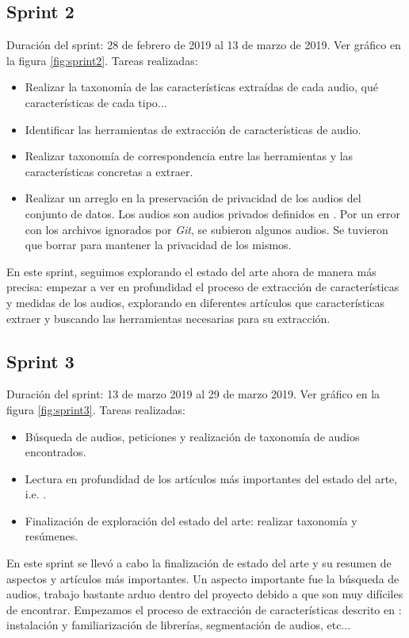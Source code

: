 \subsection{Sprint 2}
Duración del sprint: 28 de febrero de 2019 al 13 de marzo de 2019. Ver gráfico  en la figura \ref{fig:sprint2}.
Tareas realizadas:
\begin{itemize}
\item Realizar la taxonomía de las características extraídas de cada audio, qué características de cada tipo...
\item Identificar las herramientas de extracción de características de audio.
\item Realizar taxonomía de correspondencia entre las herramientas y las características concretas a extraer.
\item Realizar un arreglo en la preservación de privacidad de los audios del conjunto de datos. Los audios son audios privados definidos en \cite{OrzCorpus}. Por un error con los archivos ignorados por \textit{Git}, se subieron algunos audios. Se tuvieron que borrar para mantener la privacidad de los mismos.
\end{itemize}
En este sprint, seguimos explorando el estado del arte ahora de manera más precisa: empezar a ver en profundidad el proceso de extracción de características y medidas de los audios, explorando en diferentes artículos que características extraer y buscando las herramientas necesarias para su extracción.

\subsection{Sprint 3}
Duración del sprint: 13 de marzo 2019 al 29 de marzo 2019. Ver gráfico  en la figura \ref{fig:sprint3}.
Tareas realizadas:
\begin{itemize}
\item Búsqueda de audios, peticiones y realización de taxonomía de audios encontrados.
\item Lectura en profundidad de los artículos más importantes del estado del arte, i.e. \cite{Orz2016}.
\item Finalización de exploración del estado del arte: realizar taxonomía y resúmenes.
\end{itemize}
En este sprint se llevó a cabo la finalización de estado del arte y su resumen de aspectos y artículos más importantes. Un aspecto importante fue la búsqueda de audios, trabajo bastante arduo dentro del proyecto debido a que son muy difíciles de encontrar. Empezamos el proceso de extracción de características descrito en \cite{Orz2016}: instalación y familiarización de librerías, segmentación de audios, etc...

